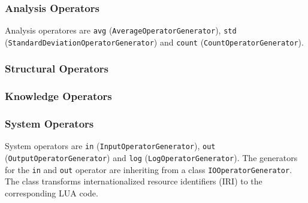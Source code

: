 \subsubsection{Analysis Operators}
Analysis operatores are \texttt{avg} (\texttt{AverageOperatorGenerator}), 
\texttt{std} (\texttt{StandardDeviationOper\-atorGenerator}) and \texttt{count}
(\texttt{CountOperatorGenerator}).

\subsubsection{Structural Operators}

\subsubsection{Knowledge Operators}

\subsubsection{System Operators}
System operators are \texttt{in} (\texttt{InputOperatorGenerator}), 
\texttt{out} (\texttt{OutputOperatorGenerator}) and \texttt{log} 
(\texttt{LogOperatorGenerator}). The generators for the \texttt{in} and 
\texttt{out} operator are inheriting from a class \texttt{IOOperatorGenerator}.
The class transforms internationalized resource identifiers (IRI) to the 
corresponding LUA code. 
